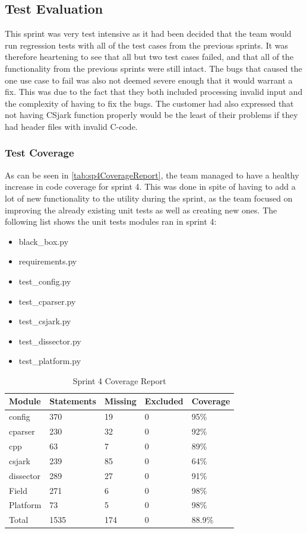 \subsection{Test Evaluation}
This sprint was very test intensive as it had been decided that the team would run regression tests with all of the test cases from the previous sprints.
It was therefore heartening to see that all but two test cases failed, and that all of the functionality from the previous sprints were still intact.
The bugs that caused the one use case to fail was also not deemed severe enough that it would warrant a fix. This was due to the fact that they both
included processing invalid input and the complexity of having to fix the bugs. The customer had also expressed that not having CSjark function properly
would be the least of their problems if they had header files with invalid C-code.

\subsubsection{Test Coverage}
As can be seen in \autoref{tab:sp4CoverageReport}, the team managed to have a healthy increase in code coverage for sprint 4. This was done in spite of having to add a lot of new functionality to the utility during the sprint, as the team focused on improving the already existing unit tests as well as creating new ones. The following list shows the unit tests modules ran in sprint 4:

\begin{itemize}
	\item black\_box.py
	\item requirements.py
	\item test\_config.py
	\item test\_cparser.py
	\item test\_csjark.py
	\item test\_dissector.py
	\item test\_platform.py
\end{itemize}

\begin{table}[!htb] \footnotesize \center
	\caption{Sprint 4 Coverage Report\label{tab:sp4CoverageReport}}
	\begin{tabular}{l l l l l}
		\toprule
		Module & Statements & Missing & Excluded & Coverage\\
		\midrule
		config & 370 & 19 & 0 & 95\%\ \\
		cparser & 230 & 32 & 0 & 92\%\ \\
		cpp & 63 & 7 & 0 & 89\%\ \\
		csjark & 239 & 85 & 0 & 64\%\ \\
		dissector & 289 & 27 & 0 & 91\%\ \\
		Field & 271 & 6  & 0 & 98\%\ \\
		Platform & 73 & 5 & 0 & 98\%\ \\
		Total & 1535 & 174 & 0 & 88.9\%\ \\
		\bottomrule
	\end{tabular}
\end{table}

